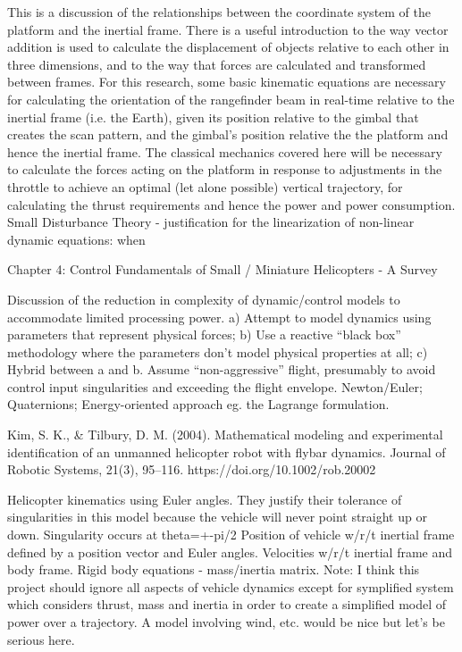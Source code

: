 This is a discussion of the relationships between the coordinate system of the platform and the inertial frame. There is a useful introduction to the way vector addition is used to calculate the displacement of objects relative to each other in three dimensions, and to the way that forces are calculated and transformed between frames. 
For this research, some basic kinematic equations are necessary for calculating the orientation of the rangefinder beam in real-time relative to the inertial frame (i.e. the Earth), given its position relative to the gimbal that creates the scan pattern, and the gimbal’s position relative the the platform and hence the inertial frame. 
The classical mechanics covered here will be necessary to calculate the forces acting on the platform in response to adjustments in the throttle to achieve an optimal (let alone possible) vertical trajectory, for calculating the thrust requirements and hence the power and power consumption.
Small Disturbance Theory - justification for the linearization of non-linear dynamic equations: when 

Chapter 4: Control Fundamentals of Small / Miniature Helicopters - A Survey

Discussion of the reduction in complexity of dynamic/control models to accommodate limited processing power. 
a) Attempt to model dynamics using parameters that represent physical forces; b) Use a reactive “black box” methodology where the parameters don’t model physical properties at all; c) Hybrid between a and b.
Assume “non-aggressive” flight, presumably to avoid control input singularities and exceeding the flight envelope.
Newton/Euler; Quaternions; Energy-oriented approach eg. the Lagrange formulation.

\cite{Kim2004}
Kim, S. K., \& Tilbury, D. M. (2004). Mathematical modeling and experimental identification of an unmanned helicopter robot with flybar dynamics. Journal of Robotic Systems, 21(3), 95–116. https://doi.org/10.1002/rob.20002

Helicopter kinematics using Euler angles. They justify their tolerance of singularities in this model because the vehicle will never point straight up or down. Singularity occurs at theta=+-pi/2
Position of vehicle w/r/t inertial frame defined by a position vector and Euler angles.
Velocities w/r/t inertial frame and body frame.
Rigid body equations - mass/inertia matrix.
Note: I think this project should ignore all aspects of vehicle dynamics except for symplified system which considers thrust, mass and inertia in order to create a simplified model of power over a trajectory. A model involving wind, etc. would be nice but let’s be serious here.


